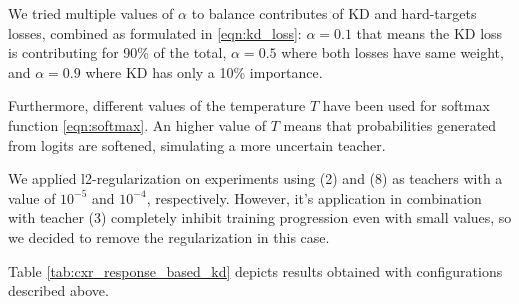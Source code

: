 We tried multiple values of $\alpha$ to balance  contributes of KD and hard-targets losses, combined as formulated in \ref{eqn:kd_loss}: $\alpha=0.1$ that means the KD loss is contributing for 90\% of the total, $\alpha=0.5$ where both losses have same weight, and $\alpha=0.9$ where KD has only a 10\% importance.

Furthermore, different values of the temperature $T$ have been used for softmax function \ref{eqn:softmax}.
An higher value of $T$ means that probabilities generated from logits are softened, simulating a more uncertain teacher.

We applied l2-regularization on experiments using (2) and (8) as teachers with a value of $10^{-5}$ and $10^{-4}$, respectively.
However, it's application in combination with teacher (3) completely inhibit training progression even with small values, so we decided to remove the regularization in this case.

Table \ref{tab:cxr_response_based_kd} depicts results obtained with configurations described above.

